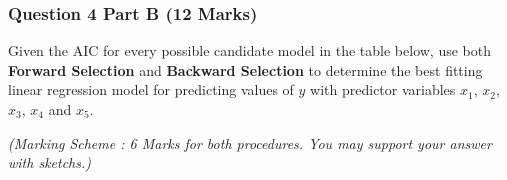 \documentclass[a4paper,12pt]{article}
\begin{document}

	
	\newpage

\subsubsection*{Question 4 Part B (12 Marks)}

Given the AIC for every possible candidate model in the table below, use both \textbf{Forward Selection} and \textbf{Backward Selection} to determine the best fitting linear regression model for predicting values of $y$ with predictor variables
$x_1$, $x_2$, $x_3$, $x_4$ and $x_5$.

\bigskip
\noindent \textit{
(Marking Scheme : 6 Marks for both procedures. You may support your answer with sketchs.)}
\end{document}
